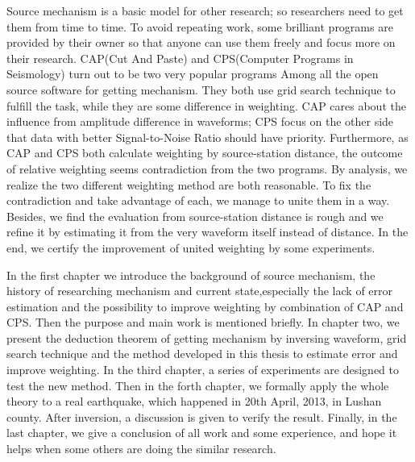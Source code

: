 \begin{enabstract}
Source mechanism is a basic model for other research; so researchers need to get them from time to time. To avoid repeating work, some brilliant programs are provided by their owner so that anyone can use them freely and focus more on their research. CAP(Cut And Paste) and CPS(Computer Programs in Seismology) turn out to be two very popular programs Among all the open source software for getting mechanism. They both use grid search technique to fulfill the task, while they are some difference in weighting. CAP cares about the influence from amplitude difference in waveforms; CPS focus on the other side that data with better Signal-to-Noise Ratio should have priority. Furthermore, as CAP and CPS both calculate weighting by source-station distance, the outcome of relative weighting seems contradiction from the two programs. By analysis, we realize the two different weighting method are both reasonable. To fix the contradiction and take advantage of each, we manage to unite them in a way. Besides, we find the evaluation from source-station distance is rough and we refine it by estimating it from the very waveform itself instead of distance. In the end, we certify the improvement of united weighting by some experiments.

In the first chapter we introduce the background of source mechanism, the history of researching mechanism and current state,especially the lack of error estimation and the possibility to improve weighting by combination of CAP and CPS. Then the purpose and main work is mentioned briefly. In chapter two, we present the deduction theorem of getting mechanism by inversing waveform, grid search technique and the method developed in this thesis to estimate error and improve weighting. In the third chapter, a series of experiments are designed to test the new method. Then in the forth chapter, we formally apply the whole theory to a real earthquake, which happened in 20th April, 2013, in Lushan county. After inversion, a discussion is given to verify the result. Finally, in the last chapter, we give a conclusion of all work and some experience, and hope it helps when some others are doing the similar research.

\end{enabstract}
\vspace{1em}\par\vfill

